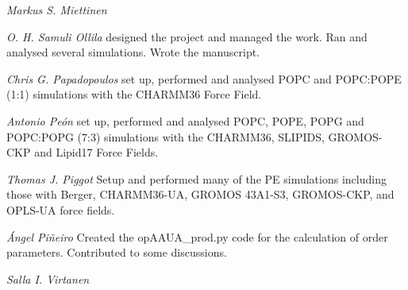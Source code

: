 \documentclass[journal=jpcbfk]{achemso}
\begin{document}
\noindent
{\it Markus S. Miettinen}

\noindent
{\it O. H. Samuli Ollila}
designed the project and managed the work.
Ran and analysed several simulations. Wrote the manuscript.

\noindent
{\it Chris G. Papadopoulos} set up, performed and analysed POPC and POPC:POPE (1:1) simulations with the CHARMM36 Force Field.

\noindent
{\it Antonio Pe{\'o}n} set up, performed and analysed POPC, POPE, POPG and POPC:POPG (7:3) simulations with the CHARMM36, SLIPIDS, GROMOS-CKP and Lipid17 Force Fields.

\noindent
{\it Thomas J. Piggot}
Setup and performed many of the PE simulations including those with Berger, CHARMM36-UA, GROMOS 43A1-S3, GROMOS-CKP, and OPLS-UA force fields.

\noindent
{\it {\'A}ngel Pi{\~n}eiro}
Created the opAAUA\_prod.py code for the calculation of order parameters. Contributed to some discussions. 

\noindent
{\it Salla I. Virtanen}


\end{document}
